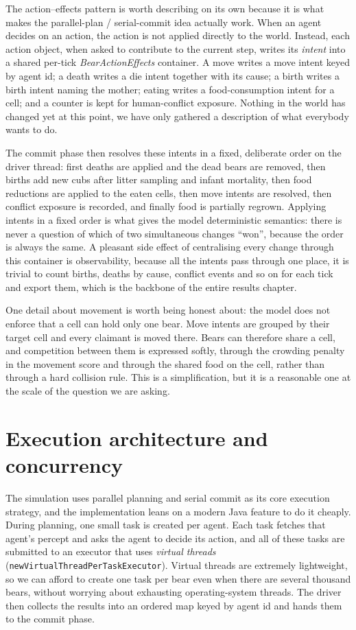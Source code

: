 The action--effects pattern is worth describing on its own because it is what makes the parallel-plan / serial-commit idea actually work. When an agent decides on an action, the action is not applied directly to the world. Instead, each action object, when asked to contribute to the current step, writes its \emph{intent} into a shared per-tick \emph{BearActionEffects} container. A move writes a move intent keyed by agent id; a death writes a die intent together with its cause; a birth writes a birth intent naming the mother; eating writes a food-consumption intent for a cell; and a counter is kept for human-conflict exposure. Nothing in the world has changed yet at this point, we have only gathered a description of what everybody wants to do.

The commit phase then resolves these intents in a fixed, deliberate order on the driver thread: first deaths are applied and the dead bears are removed, then births add new cubs after litter sampling and infant mortality, then food reductions are applied to the eaten cells, then move intents are resolved, then conflict exposure is recorded, and finally food is partially regrown. Applying intents in a fixed order is what gives the model deterministic semantics: there is never a question of which of two simultaneous changes ``won'', because the order is always the same. A pleasant side effect of centralising every change through this container is observability, because all the intents pass through one place, it is trivial to count births, deaths by cause, conflict events and so on for each tick and export them, which is the backbone of the entire results chapter.

One detail about movement is worth being honest about: the model does not enforce that a cell can hold only one bear. Move intents are grouped by their target cell and every claimant is moved there. Bears can therefore share a cell, and competition between them is expressed softly, through the crowding penalty in the movement score and through the shared food on the cell, rather than through a hard collision rule. This is a simplification, but it is a reasonable one at the scale of the question we are asking.

\section{Execution architecture and concurrency}

The simulation uses parallel planning and serial commit as its core execution strategy, and the implementation leans on a modern Java feature to do it cheaply. During planning, one small task is created per agent. Each task fetches that agent's percept and asks the agent to decide its action, and all of these tasks are submitted to an executor that uses \emph{virtual threads} (\texttt{newVirtualThreadPerTaskExecutor}). Virtual threads are extremely lightweight, so we can afford to create one task per bear even when there are several thousand bears, without worrying about exhausting operating-system threads. The driver then collects the results into an ordered map keyed by agent id and hands them to the commit phase.

